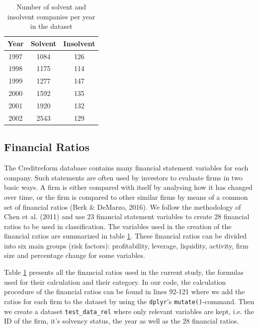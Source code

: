 \documentclass{article}
\begin{document}
\begin{table}
\caption{Number of solvent and insolvent companies per year in the dataset}
\label{finRatios}
\begin{center}
\begin{tabular}{ccc} 
\hline\hline
Year & Solvent & Insolvent\\ 
\hline
1997 & 1084 & 126 \\
1998 & 1175 & 114 \\
1999 & 1277 & 147 \\
2000 & 1592 & 135 \\
2001 & 1920 & 132 \\
2002 & 2543 & 129 \\
\hline\hline
\end{tabular}
\end{center}
\end{table}

\subsection{Financial Ratios}

The Creditreform database contains many financial statement variables for each company. Such statements are often used by investors to evaluate firms in two basic ways. A firm is either compared with itself by analysing how it has changed over time, or the firm is compared to other similar firms by means of a common set of financial ratios (Berk \& DeMarzo, 2016).  We follow the methodology of Chen et al. (2011) and use 23 financial statement variables to create 28 financial ratios to be used in classification. The variables used in the creation of the financial ratios are summarized in table \ref{finRatios}. These financial ratios can be divided into six main groups (risk factors): profitability, leverage, liquidity, activity, firm size and percentage change for some variables.

Table \ref{finRatios} presents all the financial ratios used in the current study, the formulas used for their calculation and their category. In our code, the calculation procedure of the financial ratios can be found in lines 92-121 where we add the ratios for each firm to the dataset by using the \texttt{dplyr}'s \texttt{mutate()}-command. Then we create a dataset \texttt{test\_data\_rel} where only relevant variables are kept, i.e. the ID of the firm, it's solvency status, the year as well as the 28 financial ratios. 
\end{document}
